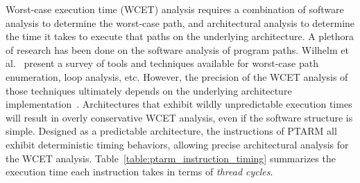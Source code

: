 \label{subsec:precision_timing_inst_ptarm}
Worst-case execution time (WCET) analysis requires a combination of software analysis to determine the worst-case path, and architectural analysis to determine the time it takes to execute that paths on the underlying architecture. 
A plethora of research has been done on the software analysis of program paths. 
Wilhelm et al.~\cite{wilhelm-survey-paper} present a survey of tools and techniques available for worst-case path enumeration, loop analysis, etc.
However, the precision of the WCET analysis of those techniques ultimately depends on the underlying architecture implementation~\cite{Heckmann2003processor}.
Architectures that exhibit wildly unpredictable execution times will result in overly conservative WCET analysis, even if the software structure is simple. 
Designed as a predictable architecture, the instructions of PTARM all exhibit deterministic timing behaviors, allowing precise architectural analysis for the WCET analysis.
Table~\ref{table:ptarm_instruction_timing} summarizes the execution time each instruction takes in terms of \emph{thread cycles}. 

